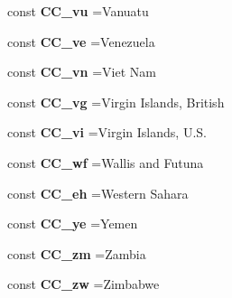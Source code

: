 \begin{DoxyCompactItemize}
const {\bfseries C\+C\+\_\+vu} =\textquotesingle{}Vanuatu\textquotesingle{}
\item 
\hypertarget{class_i_s_o_a910cc317104b8b57c71b58a3dab974ae}{}\label{class_i_s_o_a910cc317104b8b57c71b58a3dab974ae} 
const {\bfseries C\+C\+\_\+ve} =\textquotesingle{}Venezuela\textquotesingle{}
\item 
\hypertarget{class_i_s_o_a5de91fb7329dcfef0bb8a27e9fcc64f6}{}\label{class_i_s_o_a5de91fb7329dcfef0bb8a27e9fcc64f6} 
const {\bfseries C\+C\+\_\+vn} =\textquotesingle{}Viet Nam\textquotesingle{}
\item 
\hypertarget{class_i_s_o_a372ead7d36d01b3671bbd3fe2ccbe96c}{}\label{class_i_s_o_a372ead7d36d01b3671bbd3fe2ccbe96c} 
const {\bfseries C\+C\+\_\+vg} =\textquotesingle{}Virgin Islands, British\textquotesingle{}
\item 
\hypertarget{class_i_s_o_a8f6a3ce833dc698cfc9e56426c7bbf0a}{}\label{class_i_s_o_a8f6a3ce833dc698cfc9e56426c7bbf0a} 
const {\bfseries C\+C\+\_\+vi} =\textquotesingle{}Virgin Islands, U.\+S.\textquotesingle{}
\item 
\hypertarget{class_i_s_o_ae006ad17b66d62b7c35514e83fb7bb93}{}\label{class_i_s_o_ae006ad17b66d62b7c35514e83fb7bb93} 
const {\bfseries C\+C\+\_\+wf} =\textquotesingle{}Wallis and Futuna\textquotesingle{}
\item 
\hypertarget{class_i_s_o_aa3896a624a2b3a2e2d9f6c460ca4dd77}{}\label{class_i_s_o_aa3896a624a2b3a2e2d9f6c460ca4dd77} 
const {\bfseries C\+C\+\_\+eh} =\textquotesingle{}Western Sahara\textquotesingle{}
\item 
\hypertarget{class_i_s_o_a45168197fdfb4ba132a30c529897e870}{}\label{class_i_s_o_a45168197fdfb4ba132a30c529897e870} 
const {\bfseries C\+C\+\_\+ye} =\textquotesingle{}Yemen\textquotesingle{}
\item 
\hypertarget{class_i_s_o_a9e3ecf2e3f71ec953afb178f6384b9be}{}\label{class_i_s_o_a9e3ecf2e3f71ec953afb178f6384b9be} 
const {\bfseries C\+C\+\_\+zm} =\textquotesingle{}Zambia\textquotesingle{}
\item 
\hypertarget{class_i_s_o_a794dcc9b674c0ca4e0989b96598910e8}{}\label{class_i_s_o_a794dcc9b674c0ca4e0989b96598910e8} 
const {\bfseries C\+C\+\_\+zw} =\textquotesingle{}Zimbabwe\textquotesingle{}
\end{DoxyCompactItemize}

